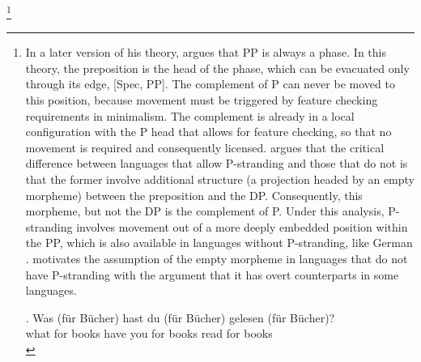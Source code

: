 \footnote{In a later version of his theory, \citet{abels2012} argues that PP is always a phase. In this theory, the preposition is the head of the phase, which can be evacuated only through its edge, [Spec, PP]. The complement of P can never be moved to this position, because movement must be triggered by feature checking requirements in minimalism. The complement is already in a local configuration with the P head that allows for feature checking, so that no movement is required and consequently licensed. \citet[245-268]{abels2012} argues that the critical difference between languages that allow P-stranding and those that do not is that the former involve additional structure (a projection headed by an empty morpheme) between the preposition and the DP. Consequently, this morpheme, but not the DP is the complement of P. Under this analysis, P-stranding involves movement out of a more deeply embedded position within the PP, which is also available in languages without P-stranding, like German \Next. \citeauthor{abels2012} motivates the assumption of the empty morpheme in languages that do not have P-stranding with the argument that it has overt counterparts in some languages.

\exg. Was (für Bücher) hast du (für Bücher) gelesen (für Bücher)?\\
      what for books have you for books read for books\\

}\afterfn%
%

